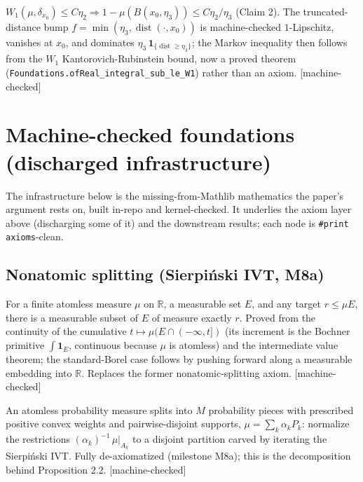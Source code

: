 \begin{lemma}\label{lem:markov}\leanok
$W_1(\mu,\delta_{x_0})\le C\eta_2 \Rightarrow 1-\mu(B(x_0,\eta_3))\le C\eta_2/\eta_3$ (Claim 2). The
truncated-distance bump $f=\min(\eta_3,\operatorname{dist}(\cdot,x_0))$ is machine-checked $1$-Lipschitz,
vanishes at $x_0$, and dominates $\eta_3\,\mathbf 1_{\{\operatorname{dist}\ge\eta_3\}}$; the Markov
inequality then follows from the $W_1$ Kantorovich-Rubinstein bound, now a proved theorem
(\texttt{Foundations.ofReal\_integral\_sub\_le\_W1}) rather than an axiom. [machine-checked]
\end{lemma}

\section{Machine-checked foundations (discharged infrastructure)}

The infrastructure below is the missing-from-Mathlib mathematics the paper's argument rests on, built
in-repo and kernel-checked. It underlies the axiom layer above (discharging some of it) and the
downstream results; each node is \texttt{\#print axioms}-clean.

\subsection{Nonatomic splitting (Sierpiński IVT, M8a)}

\begin{lemma}\label{found:sierpinski}\leanok
For a finite atomless measure $\mu$ on $\mathbb R$, a measurable set $E$, and any target $r \le \mu E$,
there is a measurable subset of $E$ of measure exactly $r$. Proved from the continuity of the
cumulative $t \mapsto \mu(E \cap (-\infty,t])$ (its increment is the Bochner primitive
$\int \mathbf 1_E$, continuous because $\mu$ is atomless) and the intermediate value theorem; the
standard-Borel case follows by pushing forward along a measurable embedding into $\mathbb R$. Replaces
the former nonatomic-splitting axiom. [machine-checked]
\end{lemma}

\begin{lemma}\label{found:atomless}\leanok
An atomless probability measure splits into $M$ probability pieces with prescribed positive convex
weights and pairwise-disjoint supports, $\mu = \sum_k \alpha_k P_k$: normalize the restrictions
$(\alpha_k)^{-1}\,\mu|_{A_k}$ to a disjoint partition carved by iterating the Sierpiński IVT. Fully
de-axiomatized (milestone M8a); this is the decomposition behind Proposition 2.2. [machine-checked]
\end{lemma}

